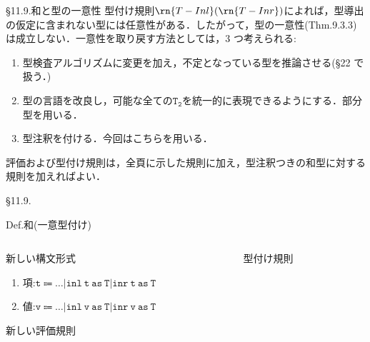 \documentclass[9pt]{beamer}
\begin{document}
\begin{frame}{\S11.9.和と型の一意性}
型付け規則$\rn{T-Inl}(\rn{T-Inr})$によれば，型導出の仮定に含まれない型には任意性がある．したがって，型の一意性(Thm.9.3.3)は成立しない．一意性を取り戻す方法としては，3 つ考えられる:\begin{enumerate}
\item 型検査アルゴリズムに変更を加え，不定となっている型を推論させる(\S22 で扱う．)
\item 型の言語を改良し，可能な全ての$\mathtt{T_{2}}$を統一的に表現できるようにする．部分型を用いる．
\item 型注釈を付ける．今回はこちらを用いる．
\end{enumerate}
評価および型付け規則は，全頁に示した規則に加え，型注釈つきの和型に対する規則を加えればよい．
\end{frame}
\begin{frame}{\S11.9.}
\begin{alertblock}{Def.和(一意型付け)}
\begin{columns}
\begin{column}{0.5\columnwidth}
新しい構文形式\begin{enumerate}
\item 項:$\mathtt{t\Coloneq\ldots|inl\ t\ as\ T|inr\ t\ as\ T}$
\item 値:$\mathtt{v\Coloneq\ldots|inl\ v\ as\ T|inr\ v\ as\ T}$
\end{enumerate}
新しい評価規則
\end{column}
\begin{column}{0.5\columnwidth}
型付け規則
\end{column}
\end{columns}
\end{alertblock}
\end{frame}
\end{document}
